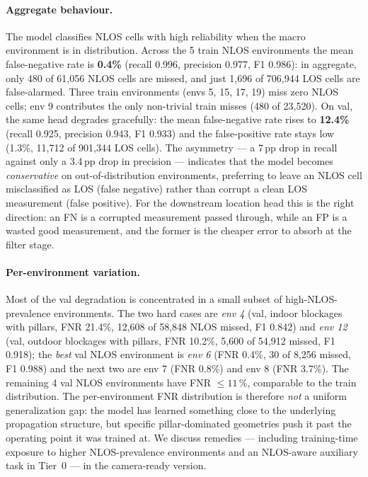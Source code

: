 \paragraph{Aggregate behaviour.}
The model classifies NLOS cells with high reliability when
the macro environment is in distribution. Across the 5 train
NLOS environments the mean false-negative rate is
\textbf{0.4\%} (recall 0.996, precision 0.977, F1 0.986): in
aggregate, only 480 of 61{,}056 NLOS cells are missed, and
just 1{,}696 of 706{,}944 LOS cells are false-alarmed.
Three train environments (envs 5, 15, 17, 19) miss zero
NLOS cells; env 9 contributes the only non-trivial
train misses (480 of 23{,}520). On val, the same head
degrades gracefully: the mean false-negative rate rises to
\textbf{12.4\%} (recall 0.925, precision 0.943, F1 0.933)
and the false-positive rate stays low (1.3\%, 11{,}712 of
901{,}344 LOS cells). The
asymmetry --- a 7\,pp drop in recall against only a 3.4\,pp
drop in precision --- indicates that the model becomes
\emph{conservative} on out-of-distribution environments,
preferring to leave an NLOS cell misclassified as LOS
(false negative) rather than corrupt a clean LOS measurement
(false positive). For the downstream location head this is
the right direction: an FN is a corrupted measurement passed
through, while an FP is a wasted good measurement, and the
former is the cheaper error to absorb at the filter stage.

\paragraph{Per-environment variation.}
Most of the val degradation is concentrated in a small
subset of high-NLOS-prevalence environments. The two hard
cases are \emph{env 4} (val, indoor blockages with pillars,
FNR 21.4\%, 12{,}608 of 58{,}848 NLOS missed, F1 0.842) and
\emph{env 12} (val, outdoor blockages with pillars, FNR
10.2\%, 5{,}600 of 54{,}912 missed, F1 0.918); the
\emph{best} val NLOS environment is \emph{env 6} (FNR
0.4\%, 30 of 8{,}256 missed, F1 0.988) and the next
two are env 7 (FNR 0.8\%) and env 8 (FNR 3.7\%). The
remaining 4 val NLOS environments have FNR $\leq 11$\,\%,
comparable to the train distribution. The per-environment
FNR distribution is therefore \emph{not} a uniform
generalization gap: the model has learned something close
to the underlying propagation structure, but specific
pillar-dominated geometries push it past the operating
point it was trained at. We discuss remedies --- including
training-time exposure to higher NLOS-prevalence
environments and an NLOS-aware auxiliary task in Tier~0
--- in the camera-ready version.

